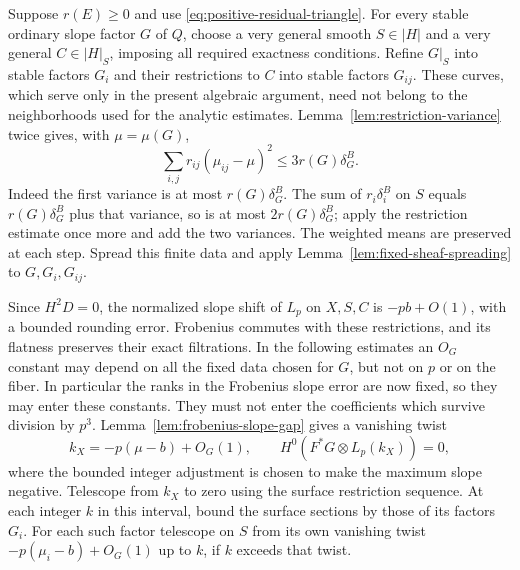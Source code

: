 Suppose $r(E)\geq0$ and use
\eqref{eq:positive-residual-triangle}.  For every stable ordinary
slope factor $G$ of $Q$, choose a very general smooth
$S\in|H|$ and a very general $C\in|H|_S$, imposing all required
exactness conditions.  Refine $G|_S$ into stable factors $G_i$
and their restrictions to $C$ into stable factors $G_{ij}$.
These curves, which serve only in the present algebraic argument,
need not belong to the neighborhoods used for the analytic
estimates.  Lemma~\ref{lem:restriction-variance} twice gives,
with $\mu=\mu(G)$,
\begin{equation}\label{eq:twice-restricted-variance}
 \sum_{i,j}r_{ij}(\mu_{ij}-\mu)^2
 \leq3r(G)\delta_G^B.
\end{equation}
Indeed the first variance is at most $r(G)\delta_G^B$.
The sum of $r_i\delta_i^B$ on $S$ equals $r(G)\delta_G^B$ plus
that variance, so is at most $2r(G)\delta_G^B$; apply the
restriction estimate once more and add the two variances.
The weighted means are preserved at each step.  Spread this
finite data and apply Lemma~\ref{lem:fixed-sheaf-spreading} to
$G,G_i,G_{ij}$.

Since $H^2D=0$, the normalized slope shift of $L_p$ on $X,S,C$ is
$-pb+O(1)$, with a bounded rounding error.  Frobenius commutes with
these restrictions, and its flatness preserves their exact
filtrations.  In the following estimates an $O_G$ constant may
depend on all the fixed data chosen for $G$, but not on $p$ or on
the fiber.  In particular the ranks in the Frobenius slope error
are now fixed, so they may enter these constants.  They must not
enter the coefficients which survive division by $p^3$.
Lemma~\ref{lem:frobenius-slope-gap} gives a vanishing
twist
\[
 k_X=-p(\mu-b)+O_G(1),\qquad
 H^0(F^*G\otimes L_p(k_X))=0,
\]
where the bounded integer adjustment is chosen to make the maximum
slope negative.  Telescope from $k_X$ to zero using the surface
restriction sequence.  At each integer $k$ in this interval,
bound the surface sections by those of its factors $G_i$.
For each such factor telescope on $S$ from its own vanishing
twist $-p(\mu_i-b)+O_G(1)$ up to $k$, if $k$ exceeds that twist.


